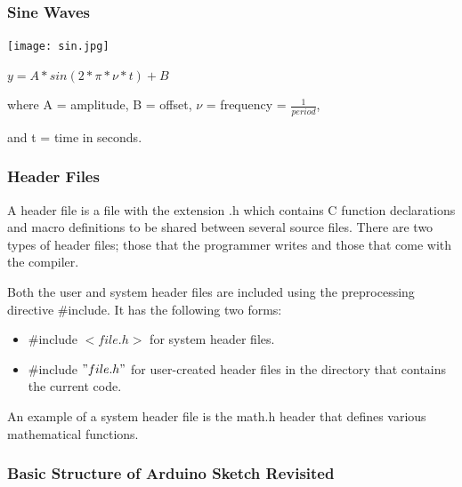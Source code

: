 \documentclass{beamer}
\begin{document}
\begin{frame}\frametitle{Sine Waves}
\begin{center}
\texttt{[image: sin.jpg]}
\end{center}

\begin{center}
$y = A * sin(2*\pi*\nu*t) + B$
\end{center}

where A = amplitude, B = offset, $\nu$ = frequency = $\frac{1}{period}$, 

and t = time in seconds.
\end{frame}

\begin{frame}\frametitle{Header Files}
A header file is a file with the extension .h which contains C function declarations and macro definitions to be shared between several source files. There are two types of header files; those that the programmer writes and those that come with the compiler. 
\vspace{0.5cm}

Both the user and system header files are included using the preprocessing directive \#include. It has the following two forms:
\begin{itemize}
\item \#include $<file.h>$ for system header files.
\item \#include $"file.h"$ for user-created header files in the directory that contains the current code. 
\end{itemize}

An example of a system header file is the math.h header that defines various mathematical functions. 
\end{frame}

\begin{frame}\frametitle{Basic Structure of Arduino Sketch Revisited}
\lstd
\end{frame}
\end{document}
